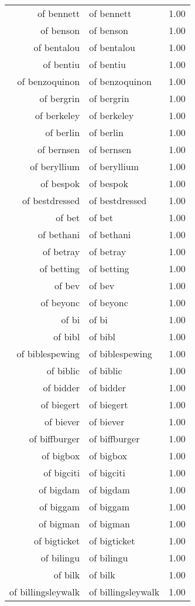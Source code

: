 \begin{table}[ht]
\begin{tabular}{rlr}
  of bennett & of bennett & 1.00 \\ 
  of benson & of benson & 1.00 \\ 
  of bentalou & of bentalou & 1.00 \\ 
  of bentiu & of bentiu & 1.00 \\ 
  of benzoquinon & of benzoquinon & 1.00 \\ 
  of bergrin & of bergrin & 1.00 \\ 
  of berkeley & of berkeley & 1.00 \\ 
  of berlin & of berlin & 1.00 \\ 
  of bernsen & of bernsen & 1.00 \\ 
  of beryllium & of beryllium & 1.00 \\ 
  of bespok & of bespok & 1.00 \\ 
  of bestdressed & of bestdressed & 1.00 \\ 
  of bet & of bet & 1.00 \\ 
  of bethani & of bethani & 1.00 \\ 
  of betray & of betray & 1.00 \\ 
  of betting & of betting & 1.00 \\ 
  of bev & of bev & 1.00 \\ 
  of beyonc & of beyonc & 1.00 \\ 
  of bi & of bi & 1.00 \\ 
  of bibl & of bibl & 1.00 \\ 
  of biblespewing & of biblespewing & 1.00 \\ 
  of biblic & of biblic & 1.00 \\ 
  of bidder & of bidder & 1.00 \\ 
  of biegert & of biegert & 1.00 \\ 
  of biever & of biever & 1.00 \\ 
  of biffburger & of biffburger & 1.00 \\ 
  of bigbox & of bigbox & 1.00 \\ 
  of bigciti & of bigciti & 1.00 \\ 
  of bigdam & of bigdam & 1.00 \\ 
  of biggam & of biggam & 1.00 \\ 
  of bigman & of bigman & 1.00 \\ 
  of bigticket & of bigticket & 1.00 \\ 
  of bilingu & of bilingu & 1.00 \\ 
  of bilk & of bilk & 1.00 \\ 
  of billingsleywalk & of billingsleywalk & 1.00 \\ 

\end{tabular}
\end{table}
